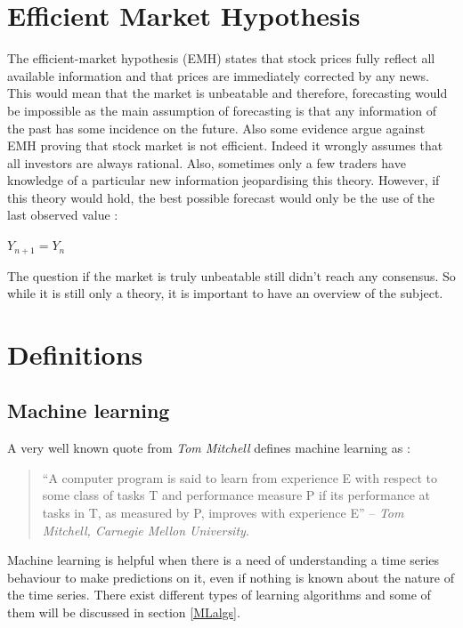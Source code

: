 \documentclass[11pt,a4paper,oneside]{book}
\begin{document}
\section{Efficient Market Hypothesis}

The efficient-market hypothesis (EMH) states that stock prices fully reflect all available information and that prices are immediately corrected by any news. This would mean that the market is unbeatable and therefore, forecasting would be impossible as the main assumption of forecasting is that any information of the past has some incidence on the future. Also some evidence argue against EMH proving that stock market is not efficient. Indeed it wrongly assumes that all investors are always rational. Also, sometimes only a few traders have knowledge of a particular new information jeopardising this theory. However, if this theory would hold, the best possible forecast would only be the use of the last observed value \cite{aamodt} : 

\begin{center}
    $Y_{n+1} = Y_{n}$
\end{center}


The question if the market is truly unbeatable still didn't reach any consensus. So while it is still only a theory, it is important to have an overview of the subject. \cite{emh}


\section{Definitions}


\subsection{Machine learning}

A very well known quote from \textit{Tom Mitchell} defines machine learning as : 

\vspace*{\fill} 
\begin{quote} 
\centering 
``A computer program is said to learn from experience E with respect to some class of tasks T and performance measure P if its performance at tasks in T, as measured by P, improves with experience E'' -- \textit{Tom Mitchell, Carnegie Mellon University}. 
\end{quote}
\vspace*{\fill}


Machine learning is helpful when there is a need of understanding a time series behaviour to make predictions on it, even if nothing is known about the nature of the time series. There exist different types of learning algorithms and some of them will be discussed in section \ref{MLalgs}.
\end{document}
